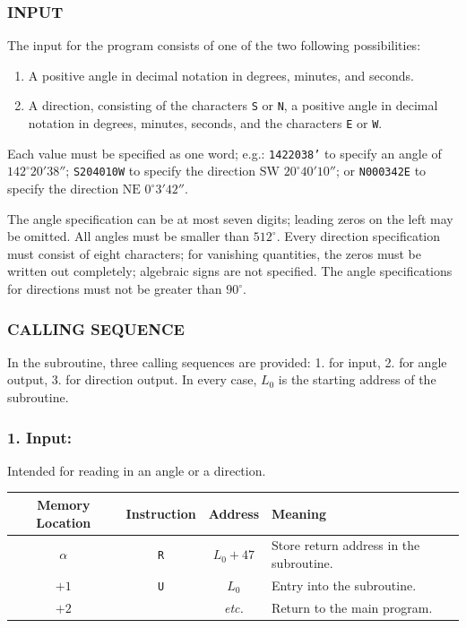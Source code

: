\subsubsection*{INPUT}
The input for the program consists of one of the two following possibilities:
\begin{enumerate}
\item A positive angle in decimal notation in degrees, minutes, and seconds.
\item A direction, consisting of the characters \texttt{S} or \texttt{N}, a positive angle in decimal notation in degrees, minutes, seconds, and the characters \texttt{E} or \texttt{W}.
\end{enumerate}
Each value must be specified as one word; e.g.: \texttt{1422038'} to specify an angle of $142^\circ 20' 38''$; \texttt{S204010W} to specify the direction $\text{SW } 20^\circ 40' 10''$; or \texttt{N000342E} to specify the direction $\text{NE } 0^\circ 3' 42''$.

The angle specification can be at most seven digits; leading zeros on the left may be omitted. All angles must be smaller than $512^\circ$. Every direction specification must consist of eight characters; for vanishing quantities, the zeros must be written out completely; algebraic signs are not specified. The angle specifications for directions must not be greater than $90^\circ$.

\subsubsection*{CALLING SEQUENCE}
In the subroutine, three calling sequences are provided: 1. for input, 2. for angle output, 3. for direction output. In every case, $L_0$ is the starting address of the subroutine.

\subsubsection*{1. Input:}
Intended for reading in an angle or a direction.
\begin{table}[h!]
\centering
\begin{tabularx}{\textwidth}{cccX}
\toprule
\textbf{Memory Location} & \textbf{Instruction} & \textbf{Address} & \textbf{Meaning} \\
\midrule
$\alpha$ & \texttt{R} & $L_0 + 47$ & Store return address in the subroutine. \\
$+1$     & \texttt{U} & $L_0$      & Entry into the subroutine. \\
$+2$     &            & \textit{etc.} & Return to the main program. \\
\bottomrule
\end{tabularx}
\end{table}

